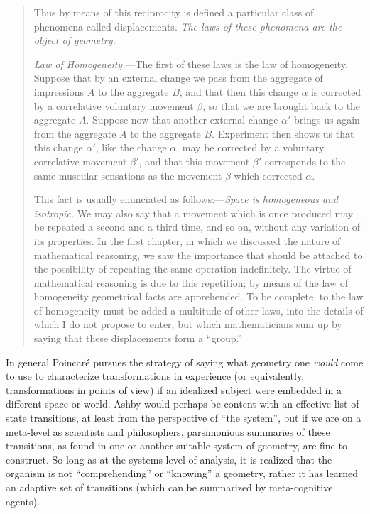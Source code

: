 \begin{quote}
    Thus by means of this reciprocity is defined a particular class of phenomena called displacements.  \emph{The laws of these phenomena are the object of geometry.}
    
    \emph{Law of Homogeneity.}---The first of these laws is the law of homogeneity.  Suppose that by an external change we pass from the aggregate of impressions $A$ to the aggregate $B$, and that then this change $\alpha$ is corrected by a correlative voluntary movement $\beta$, so that we are brought back to the aggregate $A$.  Suppose now that another external change $\alpha'$ brings us again from the aggregate $A$ to the aggregate $B$.  Experiment then shows us that this change $\alpha'$, like the change $\alpha$, may be corrected by a voluntary correlative movement $\beta'$, and that this movement $\beta'$ corresponds to the same muscular sensations as the movement $\beta$ which corrected $\alpha$.
    
    This fact is usually enunciated as follows:---\emph{Space is homogeneous and isotropic.}  We may also say that a movement which is once produced may be repeated a second and a third time, and so on, without any variation of its properties.  In the first chapter, in which we discussed the nature of mathematical reasoning, we saw the importance that should be attached to the possibility of repeating the same operation indefinitely.  The virtue of mathematical reasoning is due to this repetition; by means of the law of homogeneity geometrical facts are apprehended.  To be complete, to the law of homogeneity must be added a multitude of other laws, into the details of which I do not propose to enter, but which mathematicians sum up by saying that these displacements form a ``group.''
    
    \citep[p. 61-64]{Poincare1952}
    
\end{quote}

In general Poincar\'e pursues the strategy of saying what geometry one \emph{would} come to use to characterize transformations in experience (or equivalently, transformations in points of view) if an idealized subject were embedded in a different space or world.  Ashby would perhaps be content with an effective list of state transitions, at least from the perspective of ``the system'', but if we are on a meta-level as scientists and philosophers, parsimonious summaries of these transitions, as found in one or another suitable system of geometry, are fine to construct.  So long as at the systems-level of analysis, it is realized that the organism is not ``comprehending'' or ``knowing'' a geometry, rather it has learned an adaptive set of transitions (which can be summarized by meta-cognitive agents).

